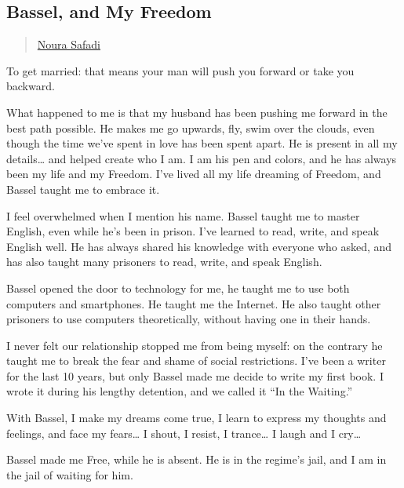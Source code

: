 \subsection{Bassel, and My Freedom}\label{bassel-and-my-freedom}

\begin{quote}
\href{../appendix/attributions.html\#noura-ghazi-safadi}{Noura Safadi}
\end{quote}

To get married: that means your man will push you forward or take you
backward.

What happened to me is that my husband has been pushing me forward in
the best path possible. He makes me go upwards, fly, swim over the
clouds, even though the time we've spent in love has been spent apart.
He is present in all my details\ldots{} and helped create who I am. I am
his pen and colors, and he has always been my life and my Freedom. I've
lived all my life dreaming of Freedom, and Bassel taught me to embrace
it.

I feel overwhelmed when I mention his name. Bassel taught me to master
English, even while he's been in prison. I've learned to read, write,
and speak English well. He has always shared his knowledge with everyone
who asked, and has also taught many prisoners to read, write, and speak
English.

Bassel opened the door to technology for me, he taught me to use both
computers and smartphones. He taught me the Internet. He also taught
other prisoners to use computers theoretically, without having one in
their hands.

I never felt our relationship stopped me from being myself: on the
contrary he taught me to break the fear and shame of social
restrictions. I've been a writer for the last 10 years, but only Bassel
made me decide to write my first book. I wrote it during his lengthy
detention, and we called it ``In the Waiting.''

With Bassel, I make my dreams come true, I learn to express my thoughts
and feelings, and face my fears\ldots{} I shout, I resist, I
trance\ldots{} I laugh and I cry\ldots{}

Bassel made me Free, while he is absent. He is in the regime's jail, and
I am in the jail of waiting for him.
